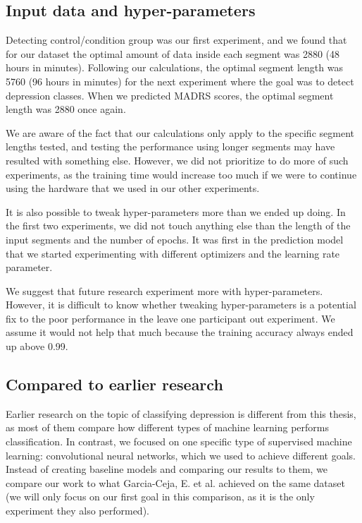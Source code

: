 \subsection{Input data and hyper-parameters}
Detecting control/condition group was our first experiment, and we found that for our dataset the optimal amount of data inside each segment was 2880 (48 hours in minutes). Following our calculations, the optimal segment length was 5760 (96 hours in minutes) for the next experiment where the goal was to detect depression classes. When we predicted MADRS scores, the optimal segment length was 2880 once again. 

We are aware of the fact that our calculations only apply to the specific segment lengths tested, and testing the performance using longer segments may have resulted with something else. However, we did not prioritize to do more of such experiments, as the training time would increase too much if we were to continue using the hardware that we used in our other experiments. 

It is also possible to tweak hyper-parameters more than we ended up doing. In the first two experiments, we did not touch anything else than the length of the input segments and the number of epochs. It was first in the prediction model that we started experimenting with different optimizers and the learning rate parameter. 

We suggest that future research experiment more with hyper-parameters. However, it is difficult to know whether tweaking hyper-parameters is a potential fix to the poor performance in the leave one participant out experiment. We assume it would not help that much because the training accuracy always ended up above 0.99. 

\subsection{Compared to earlier research}
Earlier research on the topic of classifying depression is different from this thesis, as most of them compare how different types of machine learning performs classification. In contrast, we focused on one specific type of supervised machine learning: convolutional neural networks, which we used to achieve different goals. Instead of creating baseline models and comparing our results to them, we compare our work to what Garcia-Ceja, E. et al. achieved on the same dataset (we will only focus on our first goal in this comparison, as it is the only experiment they also performed). 

